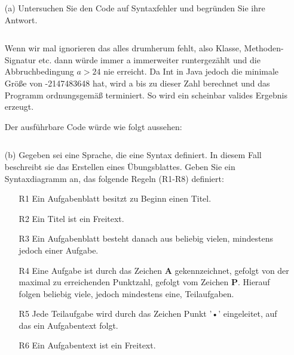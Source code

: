 \begin{itemize}
  \item [(a)] Untersuchen Sie den Code auf Syntaxfehler und begründen Sie ihre Antwort.
  \begin{itemize}
    \item []\inputminted[]{Java}{exampleA8_1_comments.java}
  \end{itemize}

  Wenn wir mal ignorieren das alles drumherum fehlt, also Klasse, 
  Methoden-Signatur etc. dann würde immer a immerweiter runtergezählt und die 
  Abbruchbedingung $a > 24$ nie erreicht. Da Int in Java jedoch die minimale Größe 
  von -2147483648 hat, wird a bis zu dieser Zahl berechnet und das Programm 
  ordnungsgemäß terminiert. So wird ein scheinbar valides Ergebnis erzeugt.

\newpage

  Der ausführbare Code würde wie folgt aussehen:
  \begin{itemize}
    \item []\inputminted[]{Java}{exampleA8_1_executable.java}
  \end{itemize}

\newpage

  \item [(b)] Gegeben sei eine Sprache, die eine Syntax definiert. In diesem Fall beschreibt sie das Erstellen eines Übungsblattes. Geben Sie ein Syntaxdiagramm an, das folgende Regeln (R1-R8) definiert:
\begin{itemize}
  \item [R1] Ein Aufgabenblatt besitzt zu Beginn einen Titel.
  
  \item [R2] Ein Titel ist ein Freitext.
  
  \item [R3] Ein Aufgabenblatt besteht danach aus beliebig vielen, mindestens jedoch einer Aufgabe.
  
  \item [R4] Eine Aufgabe ist durch das Zeichen \textbf{A} gekennzeichnet, gefolgt von der maximal zu erreichenden Punktzahl, gefolgt vom Zeichen $\mathbf{P}$. Hierauf folgen beliebig viele, jedoch mindestens eine, Teilaufgaben.
  
  \item [R5] Jede Teilaufgabe wird durch das Zeichen Punkt '•' eingeleitet, auf das ein Aufgabentext folgt.
  
  \item [R6] Ein Aufgabentext ist ein Freitext.
  

\end{itemize}
\end{itemize}
